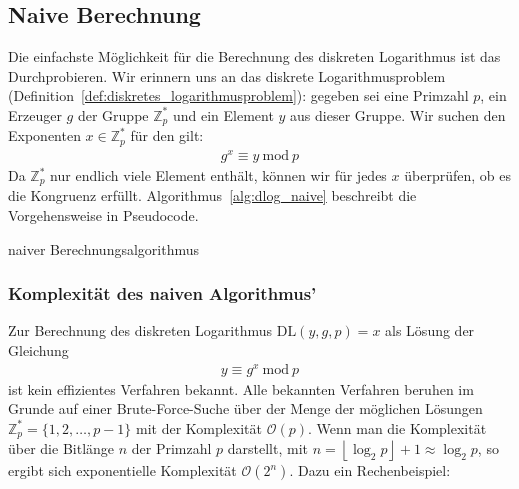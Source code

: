 \documentclass[
  a4paper,
  11pt,
]{scrartcl}
\theoremstyle{plain}
\theoremstyle{definition}
\theoremstyle{remark}
\newcommand{\Z}{\mathbb{Z}}
\renewcommand{\P}{\mathbb{P}}
\newcommand{\Mod}[1]{\ \mathrm{mod}\ #1}
\begin{document}
\subsection{Naive Berechnung}
\label{sub:naive_berechnung}

Die einfachste Möglichkeit für die Berechnung des diskreten Logarithmus ist das
Durchprobieren. Wir erinnern uns an das diskrete Logarithmusproblem
(Definition~\ref{def:diskretes_logarithmusproblem}): gegeben sei eine Primzahl
$p$, ein Erzeuger $g$ der Gruppe $\Z_p^*$ und ein Element $y$ aus dieser Gruppe.
Wir suchen den Exponenten $x \in \Z_p^*$ für den gilt:
\begin{align*}
  g^x \equiv y \Mod{p}
\end{align*}
Da $\Z_p^*$ nur endlich viele Element enthält, können wir für jedes $x$
überprüfen, ob es die Kongruenz erfüllt. Algorithmus~\ref{alg:dlog_naive}
beschreibt die Vorgehensweise in Pseudocode.

\begin{algorithm}[H]
  \caption{naiver Berechnungsalgorithmus}
  \begin{algorithmic}\label{alg:dlog_naive}
    \REQUIRE{$p \in \P, \left\langle g \right\rangle \in \Z_p^*, y \in \Z_p^*$}
      \IF{$g^x \equiv y \Mod{p}$}
      \ELSE{}
      \ENDIF{}
    \ENDFOR{}
  \end{algorithmic}
\end{algorithm}

\subsubsection{Komplexität des naiven Algorithmus’}
\label{ssub:komplexitaet_naiver_algorithmus}

Zur Berechnung des diskreten Logarithmus $\text{DL}(y,g,p) = x$ als Lösung der
Gleichung
\begin{align*}
  y \equiv g^x \Mod{p}
\end{align*}
ist kein effizientes Verfahren bekannt.
Alle bekannten Verfahren beruhen im Grunde auf einer Brute-Force-Suche über der
Menge der möglichen Lösungen $\Z_p^* = \{1, 2, \ldots, p-1\}$ mit der
Komplexität $\mathcal{O}(p)$.
Wenn man die Komplexität über die Bitlänge $n$ der Primzahl $p$ darstellt, mit
$n = \left\lfloor \log_2 p \right\rfloor + 1 \approx \log_2 p$, so ergibt sich
exponentielle Komplexität $\mathcal{O}(2^n)$. Dazu ein Rechenbeispiel:
\end{document}
